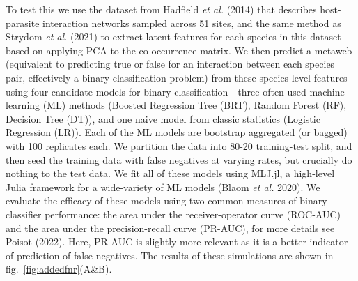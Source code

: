 \documentclass[10pt,oneside]{article}
\begin{document}
To test this we use the dataset from Hadfield \emph{et al.} (2014) that
describes host-parasite interaction networks sampled across 51 sites,
and the same method as Strydom \emph{et al.} (2021) to extract latent
features for each species in this dataset based on applying PCA to the
co-occurrence matrix. We then predict a metaweb (equivalent to
predicting true or false for an interaction between each species pair,
effectively a binary classification problem) from these species-level
features using four candidate models for binary classification---three
often used machine-learning (ML) methods (Boosted Regression Tree (BRT),
Random Forest (RF), Decision Tree (DT)), and one naive model from
classic statistics (Logistic Regression (LR)). Each of the ML models are
bootstrap aggregated (or bagged) with 100 replicates each. We partition
the data into 80-20 training-test split, and then seed the training data
with false negatives at varying rates, but crucially do nothing to the
test data. We fit all of these models using MLJ.jl, a high-level Julia
framework for a wide-variety of ML models (Blaom \emph{et al.} 2020). We
evaluate the efficacy of these models using two common measures of
binary classifier performance: the area under the receiver-operator
curve (ROC-AUC) and the area under the precision-recall curve (PR-AUC),
for more details see Poisot (2022). Here, PR-AUC is slightly more
relevant as it is a better indicator of prediction of false-negatives.
The results of these simulations are shown in
fig.~\ref{fig:addedfnr}(A\&B).
\end{document}
